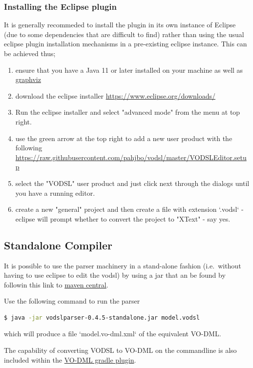 \documentclass[11pt,a4paper]{ivoa}
\begin{document}
\subsubsection{Installing the Eclipse plugin}
It is generally recommeded to install the plugin in its own instance of Eclipse (due to some dependencies that are difficult to find)
 rather than using the usual eclipse plugin installation mechanisms in a pre-existing eclipse instance. This can be achieved thus;
 
\begin{enumerate}
  \item ensure that you have a Java 11 or later installed on your machine as well as \href{https://graphviz.org}{graphviz}
\item download the eclipse installer \url{https://www.eclipse.org/downloads/}
\item Run the eclipse installer and select "advanced mode" from the menu at top right.
\item use the green arrow at the top right to add a new user product with the following 
\url{https://raw.githubusercontent.com/pahjbo/vodsl/master/VODSLEditor.setup}
\item select the "VODSL" user product and just click next through the dialogs until you have a running editor.
\item create a new "general" project and then create a file with extension `.vodsl` - eclipse will prompt whether to convert the project to "XText" - say yes.
  
\end{enumerate} 


\subsection{Standalone Compiler}
It is possible to use the parser machinery in a stand-alone fashion (i.e.\ without 
having to use eclipse to edit the vodsl) by using a jar that an be found by followin this link
to \href{https://search.maven.org/search?q=g:%22org.javastro.vodsl%22%20AND%20a:%22vodslparser%22}{maven central}.


Use the following command to run the parser
\begin{lstlisting}[language=bash]
   $ java -jar vodslparser-0.4.5-standalone.jar model.vodsl
\end{lstlisting}

which will produce a file `model.vo-dml.xml` of the equivalent VO-DML.

The capability of converting VODSL to VO-DML on the commandline is also included within the \href{https://github.com/ivoa/vo-dml/tree/master/tools}{VO-DML gradle plugin}.
\end{document}

